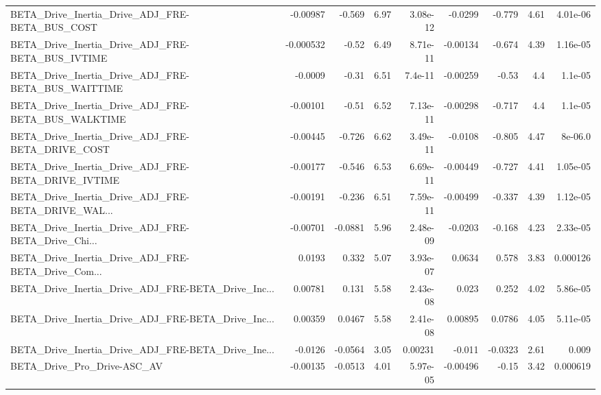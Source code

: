 \begin{tabular}{lrrrrrrrr}
BETA\_Drive\_Inertia\_Drive\_ADJ\_FRE-BETA\_BUS\_COST     &    -0.00987 &       -0.569 &     6.97 & 3.08e-12 &    -0.0299 &      -0.779 &         4.61 &      4.01e-06 \\
BETA\_Drive\_Inertia\_Drive\_ADJ\_FRE-BETA\_BUS\_IVTIME   &   -0.000532 &        -0.52 &     6.49 & 8.71e-11 &   -0.00134 &      -0.674 &         4.39 &      1.16e-05 \\
BETA\_Drive\_Inertia\_Drive\_ADJ\_FRE-BETA\_BUS\_WAITTIME &     -0.0009 &        -0.31 &     6.51 &  7.4e-11 &   -0.00259 &       -0.53 &          4.4 &       1.1e-05 \\
BETA\_Drive\_Inertia\_Drive\_ADJ\_FRE-BETA\_BUS\_WALKTIME &    -0.00101 &        -0.51 &     6.52 & 7.13e-11 &   -0.00298 &      -0.717 &          4.4 &       1.1e-05 \\
BETA\_Drive\_Inertia\_Drive\_ADJ\_FRE-BETA\_DRIVE\_COST   &    -0.00445 &       -0.726 &     6.62 & 3.49e-11 &    -0.0108 &      -0.805 &         4.47 &       8e-06.0 \\
BETA\_Drive\_Inertia\_Drive\_ADJ\_FRE-BETA\_DRIVE\_IVTIME &    -0.00177 &       -0.546 &     6.53 & 6.69e-11 &   -0.00449 &      -0.727 &         4.41 &      1.05e-05 \\
BETA\_Drive\_Inertia\_Drive\_ADJ\_FRE-BETA\_DRIVE\_WAL... &    -0.00191 &       -0.236 &     6.51 & 7.59e-11 &   -0.00499 &      -0.337 &         4.39 &      1.12e-05 \\
BETA\_Drive\_Inertia\_Drive\_ADJ\_FRE-BETA\_Drive\_Chi... &    -0.00701 &      -0.0881 &     5.96 & 2.48e-09 &    -0.0203 &      -0.168 &         4.23 &      2.33e-05 \\
BETA\_Drive\_Inertia\_Drive\_ADJ\_FRE-BETA\_Drive\_Com... &      0.0193 &        0.332 &     5.07 & 3.93e-07 &     0.0634 &       0.578 &         3.83 &      0.000126 \\
BETA\_Drive\_Inertia\_Drive\_ADJ\_FRE-BETA\_Drive\_Inc... &     0.00781 &        0.131 &     5.58 & 2.43e-08 &      0.023 &       0.252 &         4.02 &      5.86e-05 \\
BETA\_Drive\_Inertia\_Drive\_ADJ\_FRE-BETA\_Drive\_Inc... &     0.00359 &       0.0467 &     5.58 & 2.41e-08 &    0.00895 &      0.0786 &         4.05 &      5.11e-05 \\
BETA\_Drive\_Inertia\_Drive\_ADJ\_FRE-BETA\_Drive\_Ine... &     -0.0126 &      -0.0564 &     3.05 &  0.00231 &     -0.011 &     -0.0323 &         2.61 &         0.009 \\
BETA\_Drive\_Pro\_Drive-ASC\_AV                        &    -0.00135 &      -0.0513 &     4.01 & 5.97e-05 &   -0.00496 &       -0.15 &         3.42 &      0.000619 \\

\end{tabular}
